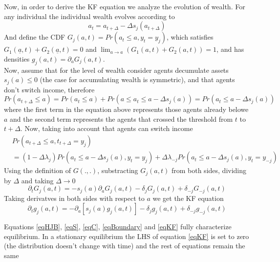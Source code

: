 \documentclass[12pt]{article}
\begin{document}
Now, in order to derive the KF equation we analyze the evolution of wealth. For any individual the individual wealth evolves according to
\begin{equation}
a_t=a_{t+\Delta}-\Delta s_j(a_{t+\Delta})
\end{equation}
And define the CDF $G_j(a,t)=Pr(a_t\leq a,y_t=y_j)$, which satisfies $G_1(\underline{a},t)+G_2(\underline{a},t)=0$ and $\lim_{a\rightarrow a}(G_1(a,t)+G_2(a,t))=1$, and has densities $g_j(a,t)=\partial_a G_j(a,t)$. \\
Now, assume that for the level of wealth consider agents decumulate assets $s_j(a)\leq0$ (the case for accumulating wealth is symmetric), and that agents don't switch income, therefore
\begin{equation}
Pr(a_{t+\Delta}\leq a)=Pr(a_{t}\leq a)+Pr(a\leq a_{t}\leq a-\Delta s_j(a))=Pr(a_{t}\leq  a-\Delta s_j(a))
\end{equation}
where the first term in the equation above represents those agents already belowe $a$ and the second term represents the agents that crossed the threshold from $t$ to $t+\Delta$. Now, taking into account that agents can switch income
\begin{equation}
\begin{split}
&Pr(a_{t+\Delta}\leq a,t_{t+\Delta}=y_j)\\
&=(1-\Delta\lambda_j)Pr(a_{t}\leq  a-\Delta s_j(a),y_t=y_j)+\Delta\lambda_{-j} Pr(a_{t}\leq  a-\Delta s_j(a),y_t=y_{-j})
\end{split}
\end{equation}
Using the definition of $G(.,.)$, substracting $G_j(a,t)$ from both sides, dividing by $\Delta$ and taking $\Delta \rightarrow 0$
\begin{equation}
\partial_tG_j(a,t)=-s_j(a)\partial_aG_j(a,t)-\delta_jG_j(a,t)+\delta_{-j}G_{-j}(a,t)
\end{equation}
Taking derivatves in both sides with respect to $a$ we get the KF equation
\begin{equation}\label{eqKF}
\partial_tg_j(a,t)=-\partial_a[s_j(a) g_j(a,t)]-\delta_jg_j(a,t)+\delta_{-j}g_{-j}(a,t)
\end{equation}
 
Equations \ref{eqHJB}, \ref{eqS}, \ref{eqC}, \ref{eqBoundary} and \ref{eqKF} fully characterize equilibrium. In a stationary equilibrium the LHS of equation \ref{eqKF} is set to zero (the distribution doesn't change with time) and the rest of equations remain the same
\end{document}

